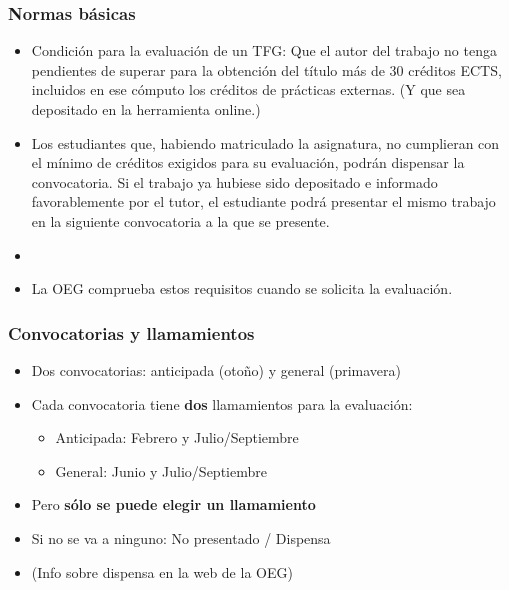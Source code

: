 \documentclass[aspectratio=43]{beamer}
\begin{document}
\begin{frame}
\frametitle{Normas básicas}
\centering


\begin{itemize}
  \item Condición para la evaluación de un TFG: Que el autor del trabajo no tenga pendientes de superar para la obtención del título más de 30 créditos ECTS, incluidos en ese cómputo los créditos de prácticas externas. (Y que sea depositado en la herramienta online.)
  \item Los estudiantes que, habiendo matriculado la asignatura, no cumplieran con el mínimo de créditos exigidos para su evaluación, podrán dispensar la convocatoria. Si el trabajo ya hubiese sido depositado e informado favorablemente por el tutor, el estudiante podrá presentar el mismo trabajo en la siguiente convocatoria a la que se presente.
  \item[]
  \item La OEG comprueba estos requisitos cuando se solicita la evaluación.
\end{itemize}


\end{frame}

\begin{frame}
\frametitle{Convocatorias y llamamientos}
\centering

\begin{itemize}
  \item Dos convocatorias: anticipada (otoño) y general (primavera)
  \item Cada convocatoria tiene \textbf{dos} llamamientos para la evaluación:
  \begin{itemize}
    \item Anticipada: Febrero y Julio/Septiembre
    \item General: Junio y Julio/Septiembre
  \end{itemize}
  \item Pero \textbf{sólo se puede elegir un llamamiento}
  \item Si no se va a ninguno: No presentado / Dispensa
  \item[] (Info sobre dispensa en la web de la OEG)
\end{itemize}

\end{frame}
\end{document}
